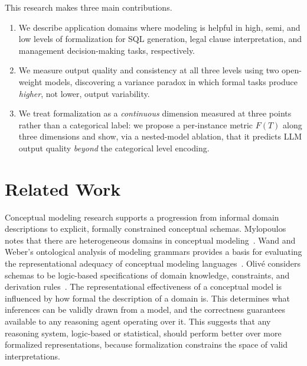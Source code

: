 \documentclass[runningheads]{llncs}
\begin{document}
This research makes three main contributions.
\begin{enumerate}[noitemsep]
  \item We describe application domains where modeling is helpful in high, semi, and low levels of formalization for SQL generation, legal clause interpretation, and management decision-making tasks, respectively.
  
  \item We measure output quality and consistency at all three levels using two open-weight models, discovering a variance paradox in which formal tasks produce \emph{higher}, not lower, output variability.

  \item We treat formalization as a \emph{continuous} dimension measured at three points rather than a categorical label: we propose a per-instance metric $F(T)$ along three dimensions and show, via a nested-model ablation, that it predicts LLM output quality \emph{beyond} the categorical level encoding.
\end{enumerate}
\fussy

\section{Related Work}
\label{sec:related}

Conceptual modeling research supports a progression from informal domain descriptions to explicit, formally constrained conceptual schemas. Mylopoulos notes that there are heterogeneous domains in conceptual modeling~\cite{mylopoulos1992conceptual}. Wand and Weber’s ontological analysis of modeling grammars provides a basis for evaluating the representational adequacy of conceptual modeling languages~\cite{DBLP:journals/isj/WandW93}. Olivé considers schemas to be logic-based specifications of domain knowledge, constraints, and derivation rules~\cite{olive2007conceptual}. The representational effectiveness of a conceptual model is influenced by how formal the description of a domain is. This determines what inferences can be validly drawn from a model, and the correctness guarantees available to any reasoning agent operating over it. This suggests that any reasoning system, logic-based or statistical, should perform better over more formalized representations, because formalization constrains the space of valid interpretations.
\end{document}
